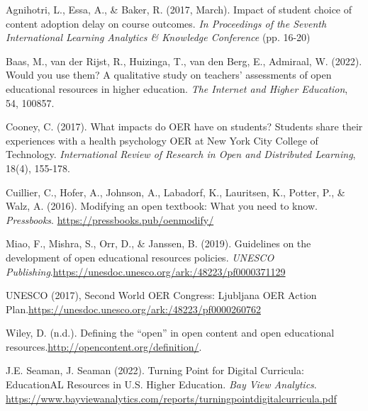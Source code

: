 \documentclass[11pt]{article}
\begin{document}
\begin{thebibliography}{99}

   Agnihotri, L., Essa, A., \& Baker, R. (2017, March). Impact of student choice of content adoption delay on course outcomes. {\em In Proceedings of the Seventh International Learning Analytics \& Knowledge Conference} (pp. 16-20)

   Baas, M., van der Rijst, R., Huizinga, T., van den Berg, E., Admiraal, W. (2022). Would you use them? A qualitative study on teachers' assessments of open educational resources in higher education. {\em The Internet and Higher Education}, 54, 100857.

   Cooney, C. (2017). What impacts do OER have on students? Students share their experiences with a health psychology OER at New York City College of Technology. {\em International Review of Research in Open and Distributed Learning}, 18(4), 155-178.

   Cuillier, C., Hofer, A., Johnson, A., Labadorf, K., Lauritsen, K., Potter, P., \& Walz, A. (2016). Modifying an open textbook: What you need to know.  {\em Pressbooks}.  \href{https://pressbooks.pub/oenmodify/}{https://pressbooks.pub/oenmodify/}

   Miao, F., Mishra, S., Orr, D., \& Janssen, B. (2019). Guidelines on the development of open educational resources policies. {\em UNESCO Publishing}.\newline \href{https://unesdoc.unesco.org/ark:/48223/pf0000371129}{https://unesdoc.unesco.org/ark:/48223/pf0000371129}

   UNESCO (2017), Second World OER Congress: Ljubljana OER Action Plan.\newline \href{https://unesdoc.unesco.org/ark:/48223/pf0000260762}{https://unesdoc.unesco.org/ark:/48223/pf0000260762}

   Wiley, D. (n.d.). Defining the ``open'' in open content and open educational resources.\newline \href{http://opencontent.org/definition/}{http://opencontent.org/definition/}.

   J.E. Seaman, J. Seaman (2022). Turning Point for Digital Curricula: EducationAL Resources in U.S. Higher Education. {\em Bay View Analytics}. \newline \href{https://www.bayviewanalytics.com/reports/turningpointdigitalcurricula.pdf}{https://www.bayviewanalytics.com/reports/turningpointdigitalcurricula.pdf}


\end{thebibliography}
\end{document}
